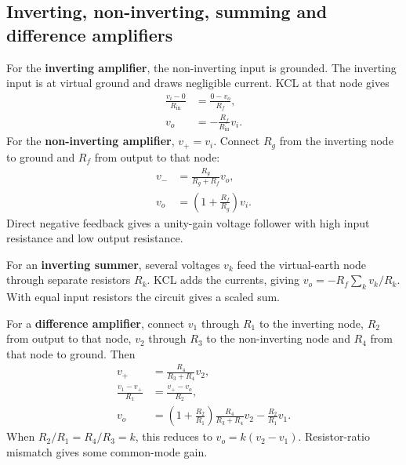\documentclass[12pt,a4paper]{article}
\begin{document}
\subsection{Inverting, non-inverting, summing and difference amplifiers}
\begin{tcolorbox}[tikzbox,title={Inverting amplifier with negative feedback},unbreakable]
\centering
{}
\end{tcolorbox}

For the \textbf{inverting amplifier}, the non-inverting input is grounded. The inverting input is at virtual ground and draws negligible current. KCL at that node gives
\[
\begin{aligned}
\frac{v_i-0}{R_{\mathrm{in}}}&=\frac{0-v_o}{R_f},\\
v_o&=-\frac{R_f}{R_{\mathrm{in}}}v_i.
\end{aligned}
\]
For the \textbf{non-inverting amplifier}, \(v_+=v_i\). Connect \(R_g\) from the inverting node to ground and \(R_f\) from output to that node:
\[
\begin{aligned}
v_-&=\frac{R_g}{R_g+R_f}v_o,\\
v_o&=\left(1+\frac{R_f}{R_g}\right)v_i .
\end{aligned}
\]
Direct negative feedback gives a unity-gain voltage follower with high input resistance and low output resistance.

For an \textbf{inverting summer}, several voltages \(v_k\) feed the virtual-earth node through separate resistors \(R_k\). KCL adds the currents, giving \(v_o=-R_f\sum_k v_k/R_k\). With equal input resistors the circuit gives a scaled sum.

For a \textbf{difference amplifier}, connect \(v_1\) through \(R_1\) to the inverting node, \(R_2\) from output to that node, \(v_2\) through \(R_3\) to the non-inverting node and \(R_4\) from that node to ground. Then
\[
\begin{aligned}
v_+ &= \frac{R_4}{R_3+R_4}v_2,\\
\frac{v_1-v_+}{R_1}&=\frac{v_+-v_o}{R_2},\\
v_o&=\left(1+\frac{R_2}{R_1}\right)
      \frac{R_4}{R_3+R_4}v_2-\frac{R_2}{R_1}v_1.
\end{aligned}
\]
When \(R_2/R_1=R_4/R_3=k\), this reduces to \(v_o=k(v_2-v_1)\). Resistor-ratio mismatch gives some common-mode gain.
\end{document}
